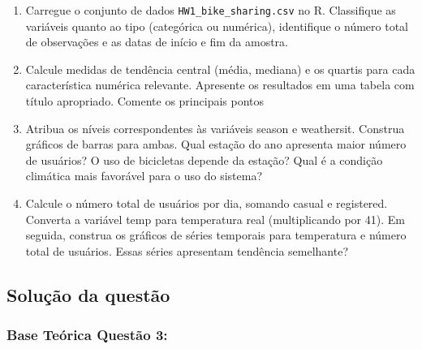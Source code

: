 \documentclass[a4paper,11pt]{article}
\begin{document}
\begin{enumerate}[leftmargin=*]
\item Carregue o conjunto de dados \texttt{HW1\_bike\_sharing.csv}  no R. Classifique as variáveis quanto ao tipo (categórica ou numérica), identifique o número total de observações e as datas de início e fim da amostra.

\item Calcule medidas de tendência central (média, mediana) e os quartis para cada característica numérica relevante. Apresente os resultados em uma tabela com título
apropriado. Comente os principais pontos

\item Atribua os níveis correspondentes às variáveis season e weathersit. Construa gráficos de barras para ambas. Qual estação do ano apresenta maior número de usuários? O uso de bicicletas depende da estação? Qual é a condição climática mais favorável para o uso do sistema?

\item Calcule o número total de usuários por dia, somando casual e registered. Converta
a variável temp para temperatura real (multiplicando por 41). Em seguida, construa os gráficos de séries temporais para temperatura e número total de usuários. Essas séries apresentam tendência semelhante?

\end{enumerate}

\subsection*{Solução da questão} 					

\subsubsection*{Base Teórica Questão 3:} 
\end{document}
